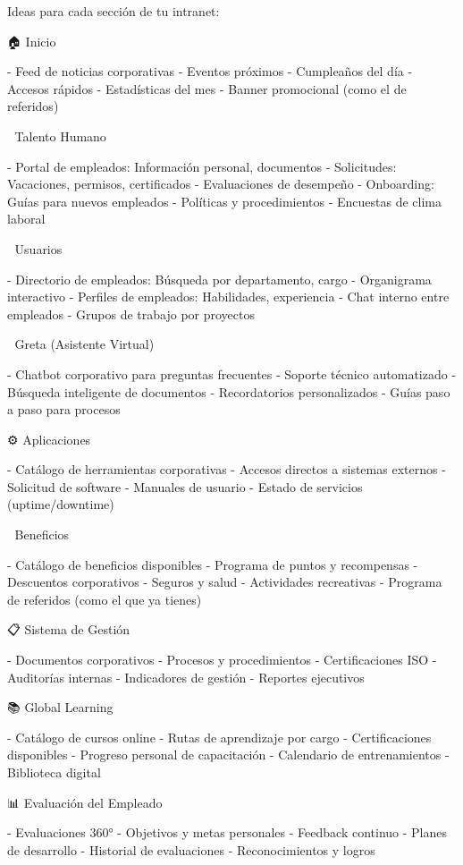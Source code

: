 
Ideas para cada sección de tu intranet:

 🏠 Inicio

- Feed de noticias corporativas
- Eventos próximos
- Cumpleaños del día
- Accesos rápidos
- Estadísticas del mes
- Banner promocional (como el de referidos)

 👥 Talento Humano

- Portal de empleados: Información personal, documentos
- Solicitudes: Vacaciones, permisos, certificados
- Evaluaciones de desempeño
- Onboarding: Guías para nuevos empleados
- Políticas y procedimientos
- Encuestas de clima laboral

 👤 Usuarios

- Directorio de empleados: Búsqueda por departamento, cargo
- Organigrama interactivo
- Perfiles de empleados: Habilidades, experiencia
- Chat interno entre empleados
- Grupos de trabajo por proyectos

 🤖 Greta (Asistente Virtual)

- Chatbot corporativo para preguntas frecuentes
- Soporte técnico automatizado
- Búsqueda inteligente de documentos
- Recordatorios personalizados
- Guías paso a paso para procesos

 ⚙️ Aplicaciones

- Catálogo de herramientas corporativas
- Accesos directos a sistemas externos
- Solicitud de software
- Manuales de usuario
- Estado de servicios (uptime/downtime)

 🎁 Beneficios

- Catálogo de beneficios disponibles
- Programa de puntos y recompensas
- Descuentos corporativos
- Seguros y salud
- Actividades recreativas
- Programa de referidos (como el que ya tienes)

 📋 Sistema de Gestión

- Documentos corporativos
- Procesos y procedimientos
- Certificaciones ISO
- Auditorías internas
- Indicadores de gestión
- Reportes ejecutivos

 📚 Global Learning

- Catálogo de cursos online
- Rutas de aprendizaje por cargo
- Certificaciones disponibles
- Progreso personal de capacitación
- Calendario de entrenamientos
- Biblioteca digital

 📊 Evaluación del Empleado

- Evaluaciones 360°
- Objetivos y metas personales
- Feedback continuo
- Planes de desarrollo
- Historial de evaluaciones
- Reconocimientos y logros
